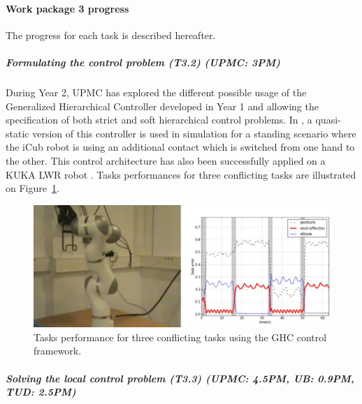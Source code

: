  
\paragraph{Work package 3 progress}

The progress for each task is described hereafter.

\subparagraph{Formulating the control problem (T3.2) (UPMC: 3PM)}

During Year 2, UPMC has explored the different possible usage of the Generalized Hierarchical Controller developed in Year 1 \cite{LiuGHC} and allowing the specification of both strict and soft hierarchical control problems. In \cite{LiuAutRobSpecIssue}, a quasi-static version of this controller is used in simulation for a standing scenario where the iCub robot is using an additional contact which is switched from one hand to the other. This control architecture has also been successfully applied on a KUKA LWR robot \cite{LiuICRA2015}. Tasks performances for three conflicting tasks are illustrated on Figure~\ref{fig:KUKA_LWR_GHC}.

\begin{figure}[h!]
\centering
\includegraphics[width=\linewidth]{images/KUKA_GHC_ICRA}
\caption{Tasks performance for three conflicting tasks using the GHC control framework.}
\label{fig:KUKA_LWR_GHC}
\end{figure}

\subparagraph{Solving the local control problem (T3.3) (UPMC: 4.5PM, UB: 0.9PM, TUD: 2.5PM)}

